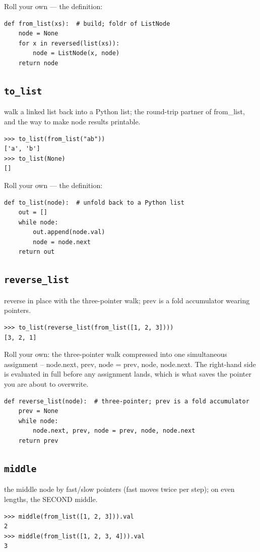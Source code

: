 \documentclass[10pt,letterpaper]{book}
\begin{document}
Roll your own --- the definition:

\begin{lstlisting}[style=ex]
def from_list(xs):  # build; foldr of ListNode
    node = None
    for x in reversed(list(xs)):
        node = ListNode(x, node)
    return node
\end{lstlisting}

\subsection{\texttt{to\_list}}\label{def:to-list}
walk a linked list back into a Python list; the round-trip partner of from\_list, and the way to make node results printable.
\begin{lstlisting}[style=ex]
>>> to_list(from_list("ab"))
['a', 'b']
>>> to_list(None)
[]
\end{lstlisting}

Roll your own --- the definition:

\begin{lstlisting}[style=ex]
def to_list(node):  # unfold back to a Python list
    out = []
    while node:
        out.append(node.val)
        node = node.next
    return out
\end{lstlisting}
\subsection{\texttt{reverse\_list}}\label{def:reverse-list}
reverse in place with the three-pointer walk; prev is a fold accumulator wearing pointers.
\begin{lstlisting}[style=ex]
>>> to_list(reverse_list(from_list([1, 2, 3])))
[3, 2, 1]
\end{lstlisting}

Roll your own: the three-pointer walk compressed into one simultaneous assignment -- node.next, prev, node = prev, node, node.next. The right-hand side is evaluated in full before any assignment lands, which is what saves the pointer you are about to overwrite.

\begin{lstlisting}[style=ex]
def reverse_list(node):  # three-pointer; prev is a fold accumulator
    prev = None
    while node:
        node.next, prev, node = prev, node, node.next
    return prev
\end{lstlisting}
\subsection{\texttt{middle}}\label{def:middle}
the middle node by fast/slow pointers (fast moves twice per step); on even lengths, the SECOND middle.
\begin{lstlisting}[style=ex]
>>> middle(from_list([1, 2, 3])).val
2
>>> middle(from_list([1, 2, 3, 4])).val
3
\end{lstlisting}
\end{document}
